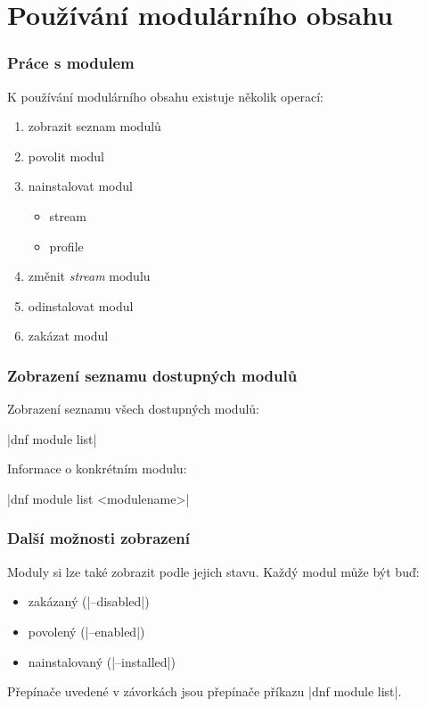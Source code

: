 \documentclass[12pt]{beamer}
\begin{document}
\section{Používání modulárního obsahu}

\begin{frame}
\frametitle{Práce s modulem}

K používání modulárního obsahu existuje několik operací:

\begin{enumerate}
	\item zobrazit seznam modulů
	\item povolit modul
	\item nainstalovat modul
	\begin{itemize}
		\item stream
		\item profile
	\end{itemize}
	\item změnit \textit{stream} modulu
	\item odinstalovat modul
	\item zakázat modul
\end{enumerate}
\end{frame}

\begin{frame}[fragile]
\frametitle{Zobrazení seznamu dostupných modulů}

Zobrazení seznamu všech dostupných modulů:

\begin{center}
	\tc|dnf module list|
\end{center}

Informace o konkrétním modulu:

\begin{center}
	\tc|dnf module list <modulename>|
\end{center}
\end{frame}

\begin{frame}[fragile]
\frametitle{Další možnosti zobrazení}

Moduly si lze také zobrazit podle jejich stavu. Každý modul může být buď:

\begin{itemize}
	\item zakázaný (\tc|--disabled|)
	\item povolený (\tc|--enabled|)
	\item nainstalovaný (\tc|--installed|)
\end{itemize}

Přepínače uvedené v závorkách jsou přepínače příkazu \tc|dnf module list|.
\end{frame}
\end{document}
